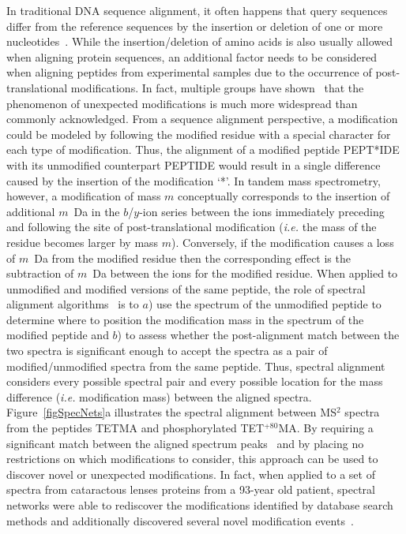 \documentclass[8.5pt,twoside,twocolumn]{article}
\begin{document}
In traditional DNA sequence alignment, it often happens that query sequences differ from the reference sequences by the insertion or deletion of one or more nucleotides~\cite{smith81}. While the insertion/deletion of amino acids is also usually allowed when aligning protein sequences, an additional factor needs to be considered when aligning peptides from experimental samples due to the occurrence of post-translational modifications. In fact, multiple groups have shown~\cite{tsur05,savitski06,na11} that the phenomenon of unexpected modifications is much more widespread
than commonly acknowledged.
%
From a sequence alignment perspective, a modification could be modeled by following the modified residue with a special character for each type of modification. Thus, the alignment of a modified peptide PEPT*IDE with its unmodified counterpart PEPTIDE would result in a single difference caused by the insertion of the modification `*'.
%
In tandem mass spectrometry, however, a modification of mass $m$ conceptually corresponds to the insertion of additional $m$~Da in the $b$/$y$-ion series between the ions immediately preceding and following the site of post-translational modification ({\em i.e.} the mass of the residue becomes larger by mass $m$). Conversely, if the modification causes a loss of $m$~Da from the modified residue then the corresponding effect is the subtraction of $m$~Da between the ions for the modified residue. When applied to unmodified and modified versions of the same peptide, the role of spectral alignment algorithms~\cite{pevzner01,bandeira04,bandeira07pnas} is to $a$) use the spectrum of the unmodified peptide to determine where to position the modification mass in the spectrum of the modified peptide and $b$) to assess whether the post-alignment match between the two spectra is significant enough to accept the spectra as a pair of modified/unmodified spectra from the same peptide. Thus, spectral alignment considers every possible spectral pair and every possible location for the mass difference ({\em i.e.} modification mass) between the aligned spectra. Figure~\ref{figSpecNets}a illustrates the spectral alignment between MS$^2$ spectra from the peptides TETMA and phosphorylated TET$^{+80}$MA. By requiring a significant match between the aligned spectrum peaks~\cite{bandeira07pnas} and by placing no restrictions on which modifications to consider, this approach can be used to discover novel or unexpected modifications. In fact, when applied to a set of spectra from cataractous lenses proteins from a 93-year old patient, spectral networks were able to rediscover the modifications identified by database search methods and additionally discovered several novel modification events~\cite{bandeira07pnas,tsur05}.
\end{document}
